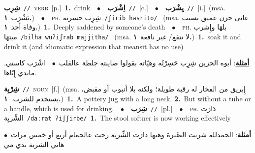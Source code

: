 \documentclass[10pt,a4paper,twoside]{article} %
\begin{document}
\begin{multicols}{2}
{\setlength\topsep{0pt}\textbf{\foreignlanguage{arabic}{شِرِب}}\ {\color{gray}\texttt{//}\color{black}}\ \textsc{verb}\ [p.]\ \textbf{1.}~drink\ \ $\bullet$\ \ \setlength\topsep{0pt}\textbf{\foreignlanguage{arabic}{اِشْرَب}}\ {\color{gray}\texttt{//}\color{black}}\ [c.]\ \ $\bullet$\ \ \setlength\topsep{0pt}\textbf{\foreignlanguage{arabic}{يِشْرَب}}\ {\color{gray}\texttt{//}\color{black}}\ [i.]\ \color{gray}(msa. \foreignlanguage{arabic}{يَشْرَب}~\foreignlanguage{arabic}{\textbf{١.}})\color{black}\ \ $\bullet$\ \ \textsc{ph.} \color{gray} \foreignlanguage{arabic}{شِرِب حسرته}\color{black}\ {\color{gray}\texttt{/{\sffamily ʃirib ħasrito}/}\color{black}}\ \color{gray} (msa. \foreignlanguage{arabic}{عانى حزن عميق بسبب وفاة أحد}~\foreignlanguage{arabic}{\textbf{١.}})\color{black}\ \textbf{1.}~Deeply saddened by someone's death\ \ $\bullet$\ \ \textsc{ph.} \color{gray} \foreignlanguage{arabic}{بلهَا وإِشرب ميتهَا}\color{black}\ {\color{gray}\texttt{/{\sffamily bilha wuʔiʃrab majjitha}/}\color{black}}\ \color{gray} (msa. \foreignlanguage{arabic}{لا تنفع/ غير نافعة}~\foreignlanguage{arabic}{\textbf{١.}})\color{black}\ \textbf{1.}~soak it and drink it (and idiomatic expression that meansit has no use)\  \begin{flushright}\color{gray}\foreignlanguage{arabic}{\textbf{\underline{\foreignlanguage{arabic}{أمثلة}}}: أبوه الحزين شِرِِب حَسِرْتُه وهيّاته بقولوا صايبته جلطة عالقلب\ $\bullet$\ \  اشْرَب كاستي. مابدي إِيّاها.}\end{flushright}\color{black}} \vspace{2mm}

{\setlength\topsep{0pt}\textbf{\foreignlanguage{arabic}{شِرْبِة}}\ {\color{gray}\texttt{//}\color{black}}\ \textsc{noun}\ [f.]\ \color{gray}(msa. \foreignlanguage{arabic}{إِبريق من الفخار له رقبة طويلة؛ ولكنه بلا أنبوب أو مقبض، يستخدم للشرب.}~\foreignlanguage{arabic}{\textbf{١.}})\color{black}\ \textbf{1.}~A pottery jug with a long neck.  \textbf{2.}~But without a tube or a handle, which is used for drinking.\ \ $\bullet$\ \ \setlength\topsep{0pt}\textbf{\foreignlanguage{arabic}{شِرَب}}\ {\color{gray}\texttt{//}\color{black}}\ [pl.]\ \ $\bullet$\ \ \textsc{ph.} \color{gray} \foreignlanguage{arabic}{دَارَت الشِّربِة}\color{black}\ {\color{gray}\texttt{/{\sffamily daːrat ʔiʃʃirbe}/}\color{black}}\ \textbf{1.}~The stool softner is now working effectively\  \begin{flushright}\color{gray}\foreignlanguage{arabic}{\textbf{\underline{\foreignlanguage{arabic}{أمثلة}}}: الحمدلله شربت الصَّبرة وهيها دارَت الشِّربِة رحت عالحمام أربع أو خمس مرات\ $\bullet$\ \  هاتي الشربة بدي مي}\end{flushright}\color{black}} \vspace{2mm}


\end{multicols}
\end{document}
